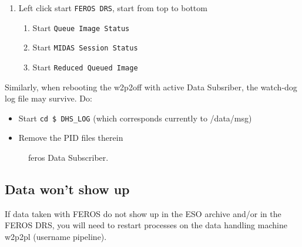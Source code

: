 \documentclass[11pt,fleqn]{book}
\begin{document}
\begin{enumerate}
\begin{enumerate}
\begin{enumerate}
             \end{enumerate}
        \item \label{list:DRS} Left click start \texttt{FEROS DRS}, start from top to bottom
            \begin{enumerate}
                \item Start \texttt{Queue Image Status}
                \item Start \texttt{MIDAS Session Status}
                \item Start \texttt{Reduced Queued Image}
            \end{enumerate}
    \end{enumerate}
\end{enumerate}
  
Similarly, when rebooting the w2p2off with active Data Subsriber, the watch-dog log file may survive. Do:
\begin{itemize}
    \item Start \texttt{cd \$ DHS\_LOG} (which corresponds currently to /data/msg)
    \item Remove the PID files therein
\end{itemize}

\begin{figure}[t!]
\begin{minipage}{0.48\linewidth}
\end{minipage}
\hspace{0.02\linewidth}
\begin{minipage}{0.48\linewidth}
\end{minipage}
\caption{\gls{feros} Data Subscriber.}
\end{figure}

\subsection{Data won't show up}

If data taken with FEROS do not show up in the ESO archive and/or in the
FEROS DRS, you will need to restart processes on the data handling machine w2p2pl (username pipeline).
\end{document}
